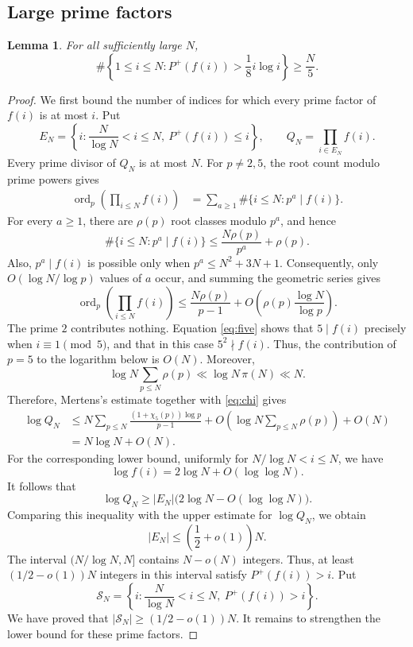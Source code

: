 \documentclass[11pt]{amsart}
\newtheorem{lemma}[theorem]{Lemma}
\theoremstyle{definition}
\theoremstyle{remark}
\begin{document}
\subsection{Large prime factors}

\begin{lemma}\label{lem:largeprime}
For all sufficiently large $N$,
\[
\#\left\{1\leq i\leq N:P^+(f(i))>\frac18 i\log i\right\}\geq\frac N5.
\]
\end{lemma}

\begin{proof}
We first bound the number of indices for which every prime factor of $f(i)$
is at most $i$.  Put
\[
E_N=\left\{i:\frac{N}{\log N}<i\leq N,\ P^+(f(i))\leq i\right\},
\qquad
Q_N=\prod_{i\in E_N}f(i).
\]
Every prime divisor of $Q_N$ is at most $N$.  For $p\neq2,5$, the root count
modulo prime powers gives
\begin{align*}
\operatorname{ord}_p\left(\prod_{i\leq N}f(i)\right)
&=\sum_{a\geq1}\#\{i\leq N:p^a\mid f(i)\}.
\end{align*}
For every $a\geq1$, there are $\rho(p)$ root classes modulo $p^a$, and hence
\[
\#\{i\leq N:p^a\mid f(i)\}
\leq \frac{N\rho(p)}{p^a}+\rho(p).
\]
Also, $p^a\mid f(i)$ is possible only when $p^a\leq N^2+3N+1$.
Consequently, only $O(\log N/\log p)$ values of $a$ occur, and summing the
geometric series gives
\[
\operatorname{ord}_p\left(\prod_{i\leq N}f(i)\right)
\leq
\frac{N\rho(p)}{p-1}
+O\left(\rho(p)\frac{\log N}{\log p}\right).
\]
The prime $2$ contributes nothing.  Equation \eqref{eq:five} shows that
$5\mid f(i)$ precisely when $i\equiv1\pmod5$, and that in this case
$5^2\nmid f(i)$.  Thus, the contribution of $p=5$ to the logarithm below is
$O(N)$.  Moreover,
\[
\log N\sum_{p\leq N}\rho(p)\ll \log N\,\pi(N)\ll N.
\]
Therefore, Mertens's estimate together with \eqref{eq:chi} gives
\begin{align*}
\log Q_N
&\leq
N\sum_{p\leq N}\frac{(1+\chi_5(p))\log p}{p-1}
+O\left(\log N\sum_{p\leq N}\rho(p)\right)+O(N)\\
&=N\log N+O(N).
\end{align*}
For the corresponding lower bound, uniformly for
$N/\log N<i\leq N$, we have
\[
\log f(i)=2\log N+O(\log\log N).
\]
It follows that
\[
\log Q_N
\geq |E_N|\bigl(2\log N-O(\log\log N)\bigr).
\]
Comparing this inequality with the upper estimate for $\log Q_N$, we obtain
\[
|E_N|\leq\left(\frac12+o(1)\right)N.
\]
The interval $(N/\log N,N]$ contains $N-o(N)$ integers.  Thus, at least
$(1/2-o(1))N$ integers in this interval satisfy $P^+(f(i))>i$.  Put
\[
\mathcal S_N=
\left\{i:\frac{N}{\log N}<i\leq N,\ P^+(f(i))>i\right\}.
\]
We have proved that $|\mathcal S_N|\geq(1/2-o(1))N$.  It remains to
strengthen the lower bound for these prime factors.


\end{proof}
\end{document}
